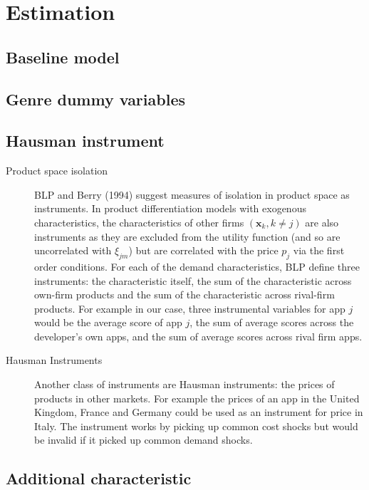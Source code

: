 \documentclass[parskip=half]{scrartcl}
\begin{document}
\section{Estimation}

\subsection{Baseline model}
\subsection{Genre dummy variables}
\subsection{Hausman instrument}

\begin{description}
	\item[Product space isolation] BLP and Berry (1994) suggest measures of isolation in product space as instruments. 
	In product differentiation models with exogenous characteristics, the characteristics of other firms $(\boldsymbol{x}_k, k \neq j)$ are also instruments as they are excluded from the utility function (and so are uncorrelated with $\xi_{jm}$) but are correlated with the price $p_j$ via the first order conditions.
	For each of the demand characteristics, BLP define three instruments: the characteristic itself, the sum of the characteristic across own-firm products and the sum of the characteristic across rival-firm products. For example in our case, three instrumental variables for app $j$ would be the average score of app $j$, the sum of average scores across the developer's own apps, and the sum of average scores across rival firm apps.
	
	\item[Hausman Instruments] Another class of instruments are Hausman instruments: the prices of products in other markets. For example the prices of an app in the United Kingdom, France and Germany could be used as an instrument for price in Italy. The instrument works by picking up common cost shocks but would be invalid if it picked up common demand shocks.
\end{description}

\subsection{Additional characteristic}

\printbibliography
\end{document}
